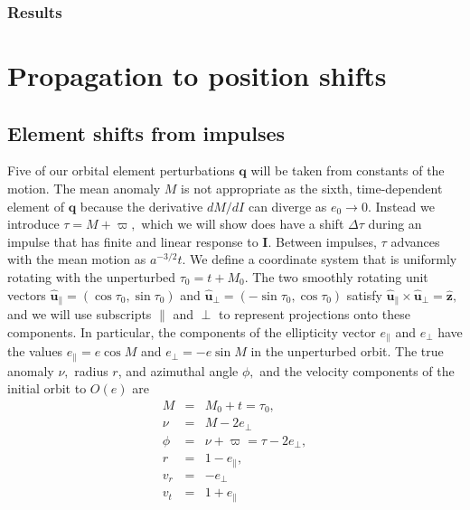 \documentclass[linenumbers, onecolumn]{aastex631}
\newcommand{\vecI}{\mathbf{I}}
\newcommand{\uhat}{\boldsymbol{\hat u}}
\newcommand{\zhat}{\mathbf{\hat z}}
\newcommand{\vecq}{\mathbf{q}}
\newcommand{\lop}{\varpi}
\begin{document}
\subsubsection{Results}


\section{Propagation to position shifts}
\label{sec:propagation}

\subsection{Element shifts from impulses}
\label{sec:elements}

Five of our orbital element perturbations $\vecq$ will be taken from constants of the motion.  The mean anomaly $M$ is not appropriate as the sixth, time-dependent element of $\vecq$ because the derivative $dM/dI$ can diverge as $e_0\rightarrow 0.$ Instead we introduce $\tau = M+\lop,$ which we will show does have a shift $\Delta\tau$ during an impulse that has finite and linear response to $\vecI$.  Between impulses, $\tau$ advances with the mean motion as $a^{-3/2}t.$  We define a coordinate system that is uniformly rotating with the unperturbed $\tau_0=t+M_0.$ The two smoothly rotating unit vectors $\uhat_\parallel=(\cos \tau_0, \sin \tau_0)$ and
$\uhat_\perp=(-\sin \tau_0, \cos \tau_0)$ satisfy $\uhat_\parallel \times \uhat_\perp = \zhat,$ and we will use subscripts $\parallel$ and $\perp$ to represent projections onto these components.  In particular, the components of the ellipticity vector $e_\parallel$ and $e_\perp$ have the values $e_\parallel=e\cos M$ and $e_\perp=-e\sin M$ in the unperturbed orbit.
The true anomaly $\nu,$ radius $r$, and azimuthal angle $\phi,$ and the velocity components of the initial orbit to $O(e)$ are
\begin{eqnarray}
  M & = & M_0 + t = \tau_0,  \nonumber \\
  \nu & = & M - 2 e_\perp \nonumber \\
  \phi & = & \nu + \lop = \tau - 2e_\perp, \nonumber\\
  r & = & 1-e_\parallel, \nonumber \\
  v_r & = & -e_\perp \nonumber \\
  v_t & = & 1 + e_\parallel
            \label{eq:kepler}
\end{eqnarray}
\end{document}
